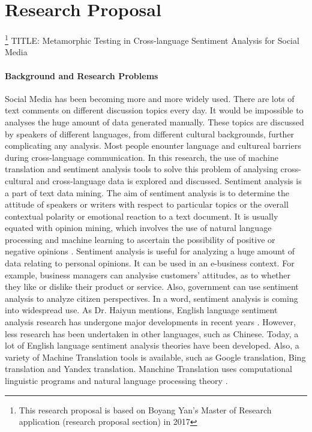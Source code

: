 \documentclass[conference]{IEEEtran}
\begin{document}
\section{Research Proposal}\footnote{This research proposal is based on Boyang
  Yan's Master of Research application (research proposal section) in 2017}
TITLE: Metamorphic Testing in Cross-language Sentiment Analysis for Social Media
\paragraph{Background and Research Problems}
Social Media has been becoming more and more widely used. There are lots of text comments
on different discussion topics every day.
It would be impossible to analyses the huge amount of data generated manually.
These topics are discussed by speakers of different languages, from different
cultural backgrounds, further complicating any analysis.
Most people enounter language and cultureal barriers during cross-language
communication.
In this research, the use of machine translation and sentiment analysis tools to
solve this problem of analysing cross-cultural and cross-language data is
explored and discussed.
Sentiment analysis is a part of text data mining. The aim of sentiment analysis
is to determine the attitude of speakers or writers with respect to particular topics
or the overall contextual polarity or emotional reaction to a text document. It is usually equated with
opinion mining, which involves the use of natural language processing and
machine learning to ascertain the possibility of positive or negative opinions
\cite{sentimentAnalysis}.
Sentiment analysis is useful for analyzing a huge amount of data relating to personal
opinions. It can be used in an e-business context. For example, business managers can analysise
customers' attitudes, as to whether they like or dislike their product or service.
Also, government can use sentiment analysis to analyze citizen perspectives.
In a word, sentiment analysis is coming into widespread use.
As Dr. Haiyun mentions, English language sentiment analysis research has
undergone major developments in recent years \cite{ChineseSentimentAnalysis}.
However, less research has been undertaken in other languages, such as Chinese.
Today, a lot of English language sentiment analysis theories have been
developed. Also, a variety of Machine Translation tools is available, such as Google
translation, Bing translation and Yandex translation.
Manchine Translation uses computational linguistic programs and natural language
processing theory \cite{machineTranslation}.
\end{document}
